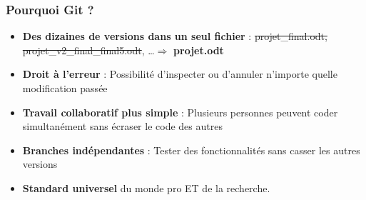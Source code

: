 \documentclass[
	11pt,
	aspectratio=169
]{beamer}
\begin{document}
\begin{frame}
    \frametitle{Pourquoi Git ?}
        \begin{itemize}
            \item \textbf{Des dizaines de versions dans un seul fichier} : \sout{projet\_final.odt, projet\_v2\_final\_final5.odt}, \dots  $\Rightarrow$ \textbf{projet.odt}
            \item \textbf{Droit à l'erreur} : Possibilité d'inspecter ou d'annuler n'importe quelle modification passée
            \item \textbf{Travail collaboratif plus simple} : Plusieurs personnes peuvent coder simultanément sans écraser le code des autres
            \item \textbf{Branches indépendantes} : Tester des fonctionnalités sans casser les autres versions
            \item \textbf{Standard universel} du monde pro ET de la recherche.
        \end{itemize}
\end{frame}
\end{document}
